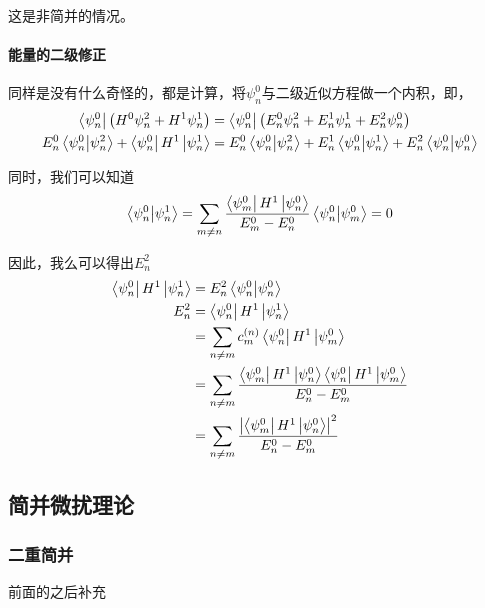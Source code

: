 \documentclass{article}
\begin{document}
这是非简并的情况。

\paragraph{能量的二级修正}
同样是没有什么奇怪的，都是计算，将$\psi_n^0$与二级近似方程做一个内积，即，
\begin{align*}
	\bra{\psi_n^0}\left(H^0\psi_n^2+H^1\psi_n^1\right)               & =\bra{\psi_n^0}\left(E_n^0\psi_n^2+E_n^1\psi_n^1+E_n^2\psi_n^0\right)                               \\
	E_n^0\braket{\psi_n^0}{\psi_n^2}+\bra{\psi_n^0}H^1\ket{\psi_n^1} & =E_n^0\braket{\psi_n^0}{\psi_n^2}+E_n^1\braket{\psi_n^0}{\psi_n^1}+E_n^2\braket{\psi_n^0}{\psi_n^0}
\end{align*}

同时，我们可以知道
\begin{align*}
	\braket{\psi_n^0}{\psi_n^1}=\sum_{m\neq n}\dfrac{\bra{\psi_m^0}H^1\ket{\psi_n^0}}{E_m^0-E_n^0}\braket{\psi_n^0}{\psi_m^0}=0
\end{align*}

因此，我么可以得出$E_n^2$
\begin{align*}
	\bra{\psi_n^0}H^1\ket{\psi_n^1} & =E_n^2\braket{\psi_n^0}{\psi_n^0}                                                                  \\
	E_n^2                           & =\bra{\psi_n^0}H^1\ket{\psi_n^1}                                                                   \\
	                                & =\sum_{n\neq m}c_m^{(n)}\bra{\psi_n^0}H^1\ket{\psi_m^0}                                            \\
	                                & =\sum_{n\neq m}\dfrac{\bra{\psi_m^0}H^1\ket{\psi_n^0}\bra{\psi_n^0}H^1\ket{\psi_m^0}}{E_n^0-E_m^0} \\
	                                & =\sum_{n\neq m}\dfrac{\left|\bra{\psi_m^0}H^1\ket{\psi_n^0}\right|^2}{E_n^0-E_m^0}
\end{align*}

\subsection{简并微扰理论}
\subsubsection{二重简并}

前面的之后补充
\end{document}
